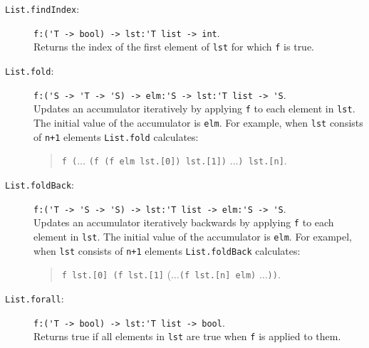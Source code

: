\documentclass[springer.tex]{subfiles}
\begin{document}
\begin{description}
\item[\texttt{List.findIndex}:] \lstinline{f:('T -> bool) -> lst:'T list -> int}.~\\
  Returns the index of the first element of \lstinline{lst} for which \lstinline{f} is true.
\item[\texttt{List.fold}:] \lstinline{f:('S -> 'T -> 'S) -> elm:'S -> lst:'T list -> 'S}.~\\
  Updates an accumulator iteratively by applying \lstinline{f} to each element in \lstinline{lst}. The initial value of the accumulator is \lstinline{elm}. For example, when \lstinline{lst} consists of \lstinline{n+1} elements
  \lstinline{List.fold} calculates:
  \begin{quote}
    \lstinline{f (}$\ldots$ \lstinline{(f (f elm lst.[0]) lst.[1])} $\ldots$\lstinline{) lst.[n]}.
  \end{quote}
\item[\texttt{List.foldBack}:] \lstinline{f:('T -> 'S -> 'S) -> lst:'T list -> elm:'S -> 'S}.~\\
  Updates an accumulator iteratively backwards by applying \lstinline{f} to each element in \lstinline{lst}. The initial value of the accumulator is \lstinline{elm}. For exampel, when \lstinline{lst} consists of \lstinline{n+1} elements
  \lstinline{List.foldBack} calculates:
  \begin{quote}
    \lstinline{f lst.[0] (f lst.[1]} ($\ldots$\lstinline{(f lst.[n] elm)} $\ldots$\lstinline{))}.
  \end{quote}
\item[\texttt{List.forall}:] \lstinline{f:('T -> bool) -> lst:'T list -> bool}.~\\
  Returns true if all elements in \lstinline{lst} are true when \lstinline{f} is applied to them.

\end{description}
\end{document}
